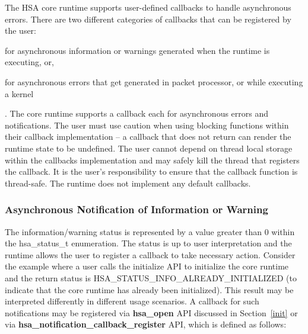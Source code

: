 \documentclass{book}
\newcommand{\reffun}[1]{\textbf{#1}}
\newcommand{\reftyp}[1]{#1}
\newcommand{\refenu}[1]{\reftyp{#1}}
\begin{document}
The HSA core runtime supports user-defined callbacks to handle
asynchronous errors. There are two different categories of callbacks
that can be registered by the user: \begin{inparaenum}[(i)] \item
for asynchronous information or warnings generated when the runtime
is executing, or, \item for asynchronous errors that get generated
in packet processor, or while executing a kernel \end{inparaenum}.
The core runtime supports a callback each for asynchronous errors
and notifications.
The user must use caution when using blocking functions within their
callback implementation -- a callback that does not return can
render the runtime state to be undefined. The user cannot depend on
thread local storage within the callbacks implementation and may
safely kill the thread that registers the callback. It is the user's
responsibility to ensure that the callback function is thread-safe.
The runtime does not implement any default callbacks.

\subsubsection{Asynchronous Notification of Information or
Warning}\label{asynnotif}

The information/warning status is represented by a value greater
than 0 within the \reftyp{hsa\_status\_t} enumeration. The status is
up to user interpretation and the runtime allows the user to
register a callback to take necessary action. Consider the example
where a user calls the initialize API to initialize the core runtime
and the return status is
\refenu{HSA\_STATUS\_INFO\_ALREADY\_INITIALIZED} (to indicate that
the core runtime has already been initialized). This result may be
interpreted differently in different usage scenarios. A callback for
such notifications may be registered via \reffun{hsa\_open} API
discussed in Section~\ref{init} or via
\reffun{hsa\_notification\_callback\_register} API, which is defined
as follows:

\makeatletter{}
\end{document}
